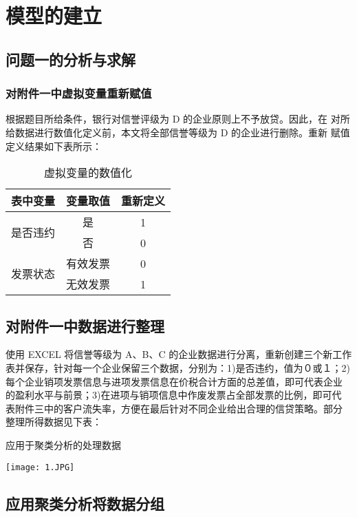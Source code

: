 \documentclass{article}
\begin{document}
    \section{模型的建立}
    \subsection{ 问题一的分析与求解}
    \subsubsection{对附件一中虚拟变量重新赋值}
    根据题目所给条件，银行对信誉评级为 D 的企业原则上不予放贷。因此，在
对所给数据进行数值化定义前，本文将全部信誉等级为 D 的企业进行删除。重新
赋值定义结果如下表所示：
    \begin{table}[htbp]
        \centering
        \caption{虚拟变量的数值化}
        \begin{tabular}{|c|c|c|}
            \hline
            表中变量 & 变量取值 & 重新定义\\
            \hline
            \multirow{2}{*}{是否违约} & 是 & 1 \\
                                    & 否 & 0\\
            \hline
            \multirow{2}{*}{发票状态} & 有效发票 & 0 \\
                                     & 无效发票 & 1 \\
            \hline
            \end{tabular}
    \end{table}
    \subsection{对附件一中数据进行整理}
    使用 EXCEL 将信誉等级为 A、B、C 的企业数据进行分离，重新创建三个新工作
表并保存，针对每一个企业保留三个数据，分别为：1)是否违约，值为０或１；2)
每个企业销项发票信息与进项发票信息在价税合计方面的总差值，即可代表企业
的盈利水平与前景；3)在进项与销项信息中作废发票占全部发票的比例，即可代
表附件三中的客户流失率，方便在最后针对不同企业给出合理的信贷策略。部分
整理所得数据见下表：
    \begin{table}[htbp]
        \centering
        \caption{应用于聚类分析的处理数据}
        \texttt{[image: 1.JPG]}
    \end{table}
\subsection{应用聚类分析将数据分组}
\end{document}

